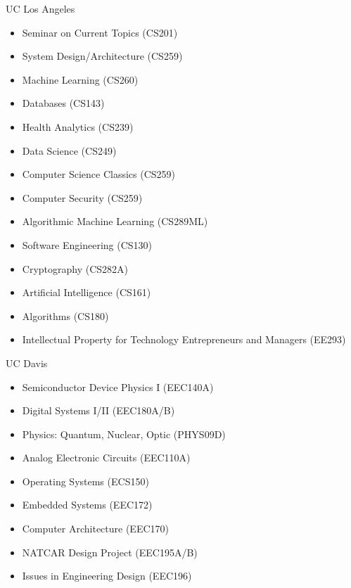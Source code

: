 \begin{cvcourses}
  \cvcourselist
    {UC Los Angeles} %
    {
      \begin{multicols}{3}
        \begin{itemize}
          \item Seminar on Current Topics (CS201)
          \item System Design/Architecture (CS259)
          \item Machine Learning (CS260)
          \item Databases (CS143)
          \item Health Analytics (CS239)
          \item Data Science (CS249)
          \item Computer Science Classics (CS259)
          \item Computer Security (CS259)
          \item Algorithmic Machine Learning (CS289ML)
          \item Software Engineering (CS130)
          \item Cryptography (CS282A)
          \item Artificial Intelligence (CS161)
          \item Algorithms (CS180)
          \item Intellectual Property for Technology Entrepreneurs and Managers (EE293)
        \end{itemize}
      \end{multicols}
    }
  \cvcourselist
    {UC Davis} %
    {
      \begin{multicols}{3}
        \begin{itemize}
          \item Semiconductor Device Physics I (EEC140A)
          \item Digital Systems I/II (EEC180A/B)
          \item Physics: Quantum, Nuclear, Optic (PHYS09D)
          \item Analog Electronic Circuits (EEC110A)
          \item Operating Systems (ECS150)
          \item Embedded Systems (EEC172)
          \item Computer Architecture (EEC170)
          \item NATCAR Design Project (EEC195A/B)
          \item Issues in Engineering Design (EEC196)

\end{itemize}
\end{multicols}}
\end{cvcourses}
